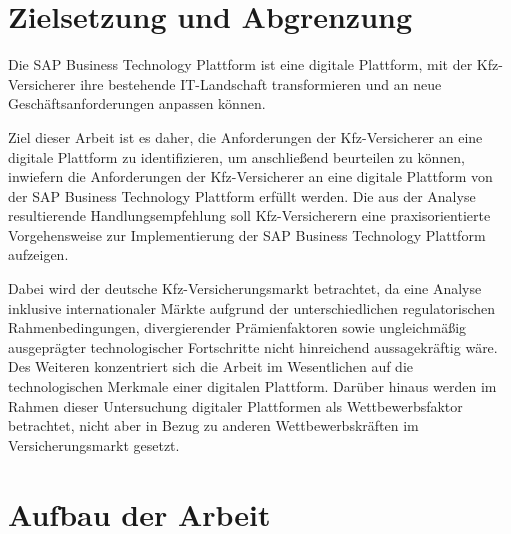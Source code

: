 \section{Zielsetzung und Abgrenzung}

Die SAP Business Technology Plattform ist eine digitale Plattform, mit der Kfz-Versicherer ihre bestehende IT-Landschaft transformieren und an neue Geschäftsanforderungen anpassen können.

Ziel dieser Arbeit ist es daher, die Anforderungen der Kfz-Versicherer an eine digitale Plattform zu identifizieren, um anschließend beurteilen zu können, inwiefern die Anforderungen der Kfz-Versicherer an eine digitale Plattform von der SAP Business Technology Plattform erfüllt werden. Die aus der Analyse resultierende Handlungsempfehlung soll Kfz-Versicherern eine praxisorientierte Vorgehensweise zur Implementierung der SAP Business Technology Plattform aufzeigen.

Dabei wird der deutsche Kfz-Versicherungsmarkt betrachtet, da eine Analyse inklusive internationaler Märkte aufgrund der unterschiedlichen regulatorischen Rahmenbedingungen, divergierender Prämienfaktoren sowie ungleichmäßig ausgeprägter technologischer Fortschritte nicht hinreichend aussagekräftig wäre. Des Weiteren konzentriert sich die Arbeit im Wesentlichen auf die technologischen Merkmale einer digitalen Plattform. Darüber hinaus werden im Rahmen dieser Untersuchung digitaler Plattformen als Wettbewerbsfaktor betrachtet, nicht aber in Bezug zu anderen Wettbewerbskräften im Versicherungsmarkt gesetzt.



\newpage
\section{Aufbau der Arbeit}

